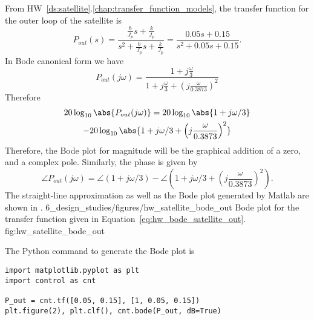 From HW~\ref{ds:satellite}.\ref{chap:transfer_function_models}, the transfer function for the outer loop of the satellite is 
\begin{equation}\label{eq:hw_bode_satellite_out_tf}
P_{out}(s) = \frac{\frac{b}{J_p}s+\frac{k}{J_p}}{s^2+\frac{b}{J_p}s+\frac{k}{J_p}} =
\frac{0.05s + 0.15}{s^2+0.05s+0.15}. 
\end{equation}
In Bode canonical form we have
\[
P_{out}(j\omega) = \frac{1+j\frac{\omega}{3}}{1+j\frac{\omega}{3} + \left(j\frac{\omega}{0.3873}\right)^2}
\]
Therefore
\begin{multline} \label{eq:hw_bode_satellite_out}
20\log_{10}\abs{P_{out}(j\omega)}=
	20\log_{10} \abs{1+j\omega/3} \\
	-20\log_{10}\abs{1+j\omega/3 + \left(j\frac{\omega}{0.3873}\right)^2}
\end{multline}
Therefore, the Bode plot for magnitude will be the graphical addition of a zero, and a complex pole.
Similarly, the phase is given by
\[
\angle P_{out}(j\omega) = 
	\angle \left(1+j\omega/3\right)
	- \angle \left(1+j\omega/3 + \left(j\frac{\omega}{0.3873}\right)^2\right).
\]
The straight-line approximation as well as the Bode plot generated by Matlab are shown in .
	{6_design_studies/figures/hw_satellite_bode_out}
	{Bode plot for the transfer function given in Equation~\eqref{eq:hw_bode_satellite_out}.}
	{fig:hw_satellite_bode_out}

The Python command to generate the Bode plot is
\begin{lstlisting}
import matplotlib.pyplot as plt
import control as cnt

P_out = cnt.tf([0.05, 0.15], [1, 0.05, 0.15])
plt.figure(2), plt.clf(), cnt.bode(P_out, dB=True)
\end{lstlisting}
